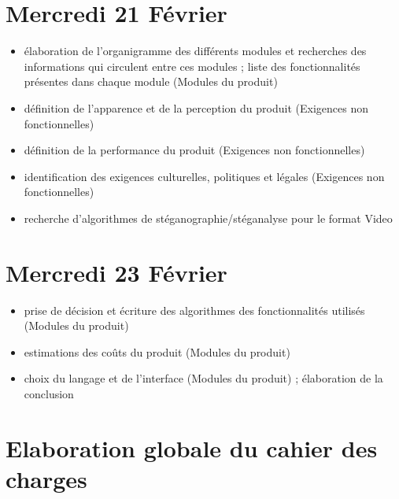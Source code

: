 \documentclass[11pt]{article}
\begin{document}
\section{Mercredi 21 Février}
\begin {itemize}
\item élaboration de l'organigramme des différents modules et recherches des informations qui circulent entre ces modules ; liste des fonctionnalités présentes dans chaque module (Modules du produit)
\item définition de l'apparence et de la perception du produit (Exigences non fonctionnelles)
\item définition de la performance du produit (Exigences non fonctionnelles)
\item identification des exigences culturelles, politiques et légales (Exigences non fonctionnelles)
\item recherche d'algorithmes de stéganographie/stéganalyse pour le format Video
\end{itemize}

\section{Mercredi 23 Février}
\begin {itemize}
\item prise de décision et écriture des algorithmes des fonctionnalités utilisés (Modules du produit)
\item estimations des coûts du produit (Modules du produit)
\item choix du langage et de l'interface (Modules du produit) ; élaboration de la conclusion
\end{itemize}

\section{Elaboration globale du cahier des charges}
\end{document}
